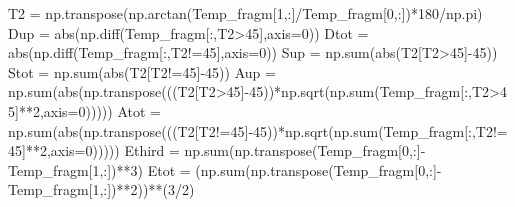 \documentclass[
  letterpaper,
]{report}
\newenvironment{Shaded}{\begin{snugshade}}{\end{snugshade}}
\newcommand{\BuiltInTok}[1]{\textcolor[rgb]{0.00,0.23,0.31}{#1}}
\newcommand{\DecValTok}[1]{\textcolor[rgb]{0.68,0.00,0.00}{#1}}
\newcommand{\NormalTok}[1]{\textcolor[rgb]{0.00,0.23,0.31}{#1}}
\newcommand{\OperatorTok}[1]{\textcolor[rgb]{0.37,0.37,0.37}{#1}}
\begin{document}
\begin{Shaded}
\begin{Highlighting}[]
    
\NormalTok{    T2   }\OperatorTok{=}\NormalTok{ np.transpose(np.arctan(Temp\_fragm[}\DecValTok{1}\NormalTok{,:]}\OperatorTok{/}\NormalTok{Temp\_fragm[}\DecValTok{0}\NormalTok{,:])}\OperatorTok{*}\DecValTok{180}\OperatorTok{/}\NormalTok{np.pi)}
\NormalTok{    Dup  }\OperatorTok{=} \BuiltInTok{abs}\NormalTok{(np.diff(Temp\_fragm[:,T2}\OperatorTok{\textgreater{}}\DecValTok{45}\NormalTok{],axis}\OperatorTok{=}\DecValTok{0}\NormalTok{))}
\NormalTok{    Dtot }\OperatorTok{=} \BuiltInTok{abs}\NormalTok{(np.diff(Temp\_fragm[:,T2}\OperatorTok{!=}\DecValTok{45}\NormalTok{],axis}\OperatorTok{=}\DecValTok{0}\NormalTok{))}
\NormalTok{    Sup  }\OperatorTok{=}\NormalTok{ np.}\BuiltInTok{sum}\NormalTok{(}\BuiltInTok{abs}\NormalTok{(T2[T2}\OperatorTok{\textgreater{}}\DecValTok{45}\NormalTok{]}\OperatorTok{{-}}\DecValTok{45}\NormalTok{))}
\NormalTok{    Stot }\OperatorTok{=}\NormalTok{ np.}\BuiltInTok{sum}\NormalTok{(}\BuiltInTok{abs}\NormalTok{(T2[T2}\OperatorTok{!=}\DecValTok{45}\NormalTok{]}\OperatorTok{{-}}\DecValTok{45}\NormalTok{))}
\NormalTok{    Aup  }\OperatorTok{=}\NormalTok{ np.}\BuiltInTok{sum}\NormalTok{(}\BuiltInTok{abs}\NormalTok{(np.transpose(((T2[T2}\OperatorTok{\textgreater{}}\DecValTok{45}\NormalTok{]}\OperatorTok{{-}}\DecValTok{45}\NormalTok{))}\OperatorTok{*}\NormalTok{np.sqrt(np.}\BuiltInTok{sum}\NormalTok{(Temp\_fragm[:,T2}\OperatorTok{\textgreater{}}\DecValTok{45}\NormalTok{]}\OperatorTok{**}\DecValTok{2}\NormalTok{,axis}\OperatorTok{=}\DecValTok{0}\NormalTok{)))))}
\NormalTok{    Atot }\OperatorTok{=}\NormalTok{ np.}\BuiltInTok{sum}\NormalTok{(}\BuiltInTok{abs}\NormalTok{(np.transpose(((T2[T2}\OperatorTok{!=}\DecValTok{45}\NormalTok{]}\OperatorTok{{-}}\DecValTok{45}\NormalTok{))}\OperatorTok{*}\NormalTok{np.sqrt(np.}\BuiltInTok{sum}\NormalTok{(Temp\_fragm[:,T2}\OperatorTok{!=}\DecValTok{45}\NormalTok{]}\OperatorTok{**}\DecValTok{2}\NormalTok{,axis}\OperatorTok{=}\DecValTok{0}\NormalTok{)))))}
\NormalTok{    Ethird }\OperatorTok{=}\NormalTok{ np.}\BuiltInTok{sum}\NormalTok{(np.transpose(Temp\_fragm[}\DecValTok{0}\NormalTok{,:]}\OperatorTok{{-}}\NormalTok{Temp\_fragm[}\DecValTok{1}\NormalTok{,:])}\OperatorTok{**}\DecValTok{3}\NormalTok{)}
\NormalTok{    Etot }\OperatorTok{=}\NormalTok{ (np.}\BuiltInTok{sum}\NormalTok{(np.transpose(Temp\_fragm[}\DecValTok{0}\NormalTok{,:]}\OperatorTok{{-}}\NormalTok{Temp\_fragm[}\DecValTok{1}\NormalTok{,:])}\OperatorTok{**}\DecValTok{2}\NormalTok{))}\OperatorTok{**}\NormalTok{(}\DecValTok{3}\OperatorTok{/}\DecValTok{2}\NormalTok{)}


\end{Highlighting}
\end{Shaded}
\end{document}
